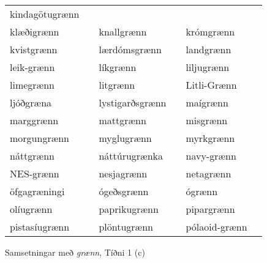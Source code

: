 \documentclass[../samsetningasafn.tex]{subfiles}
\begin{document}
\begin{wordlist}[H]
\begin{tcolorbox}
\begin{tabular}{BlBlBl}
		kindagötugrænn	&	\\  %
		klæðigrænn	&		& 
		knallgrænn	&		& 
		krómgrænn	&		\\  %
		kvistgrænn	&		& 
		lærdómsgrænn &		& 
		landgrænn	&		\\  %
		leik-grænn	&		& 
		líkgrænn		&		& 
		liljugrænn	&		\\  %
		limegrænn	&		& 
		litgrænn		&		& 
		Litli-Grænn	&		\\  %
		ljóðgræna	&		& 
		lystigarðsgrænn & 	& 
		maígrænn	&		\\  %
		marggrænn	&		& 
		mattgrænn	&		& 
		misgrænn	&		\\  %
		morgungrænn & 		& 
		myglugrænn	&		& 
		myrkgrænn	&		\\  %
		náttgrænn	&		& 
		náttúrugrænka &		& 
		navy-grænn	&		\\  %
		NES-grænn	&		& 
		nesjagrænn	&		& 
		netagrænn	&		\\  %
		öfgagræningi &		& 
		ógeðsgrænn	&		& 
		ógrænn		&		\\  %
		olíugrænn	&		& 
		paprikugrænn &		& 
		pipargrænn	&		\\  %
		pistasíugrænn & 		& 
		plöntugrænn	&		& 
		pólaoid-grænn & 			 %
	\end{tabular}

\end{tcolorbox}
	\caption{Samsetningar með \textit{grænn}, Tíðni 1 (c)}
	\label{listi:graent.1c}
\end{wordlist}		
		
\end{document}
